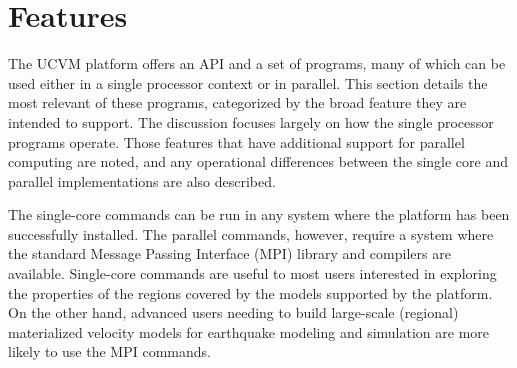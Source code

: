 
\section{Features}
\label{sec:features}

The UCVM platform offers an API and a set of programs, many of which can be used either in a single processor context or in parallel. This section details the most relevant of these programs, categorized by the broad feature they are intended to support. The discussion focuses largely on how the single processor programs operate. Those features that have additional support for parallel computing are noted, and any operational differences between the single core and parallel implementations are also described.

The single-core commands can be run in any system where the platform has been successfully installed. The parallel commands, however, require a system where the standard Message Passing Interface (MPI) library and compilers are available. Single-core commands are useful to most users interested in exploring the properties of the regions covered by the models supported by the platform. On the other hand, advanced users needing to build large-scale (regional) materialized velocity models for earthquake modeling and simulation are more likely to use the MPI commands. 









